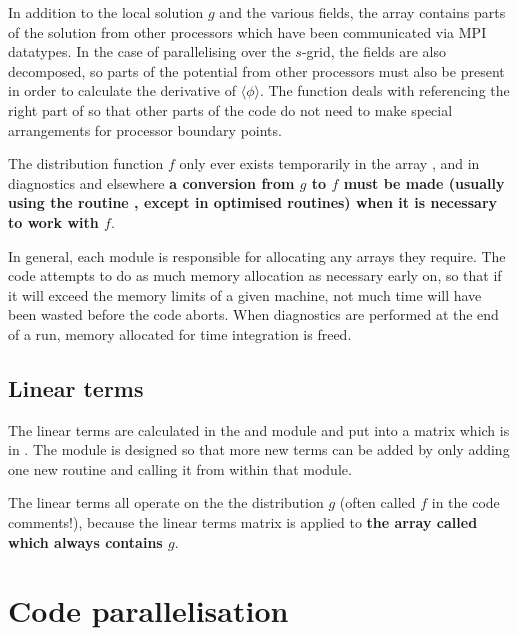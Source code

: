 In addition to the local solution $g$ and the various fields, the 
array contains parts of the solution from other processors which have been
communicated via MPI datatypes. In the case of parallelising over the $s$-grid, the
fields are also decomposed, so parts of the potential from other processors
must also be present in order to calculate the derivative of
$\langle \phi \rangle$. The  function deals with referencing the
right part of  so that other parts of the code do not need to make
special arrangements for processor boundary points.

The distribution function $f$ only ever exists temporarily in the array
, and in diagnostics and elsewhere \textbf{a conversion from
$g$ to $f$ must be made (usually using the routine , except
in optimised routines) when it is necessary to work with $f$}.

In general, each module is responsible for allocating any arrays they require.
The code attempts to do as much memory allocation as necessary early on, so
that if it will exceed the memory limits of a given machine, not much time will
have been wasted before the code aborts. When diagnostics are performed at the
end of a run, memory allocated for time integration is freed. 


\subsection{Linear terms}

The linear terms are calculated in the  and  module and put into a matrix which
is in . The  module is designed so that more new terms can be added by only
adding one new routine and calling it from within that module.

The linear terms all operate on the the distribution $g$ (often called $f$ in the code comments!), 
because the linear terms matrix is applied to \textbf{the array called  which always contains $g$}.

\section{Code parallelisation}
\label{parallelisation}

